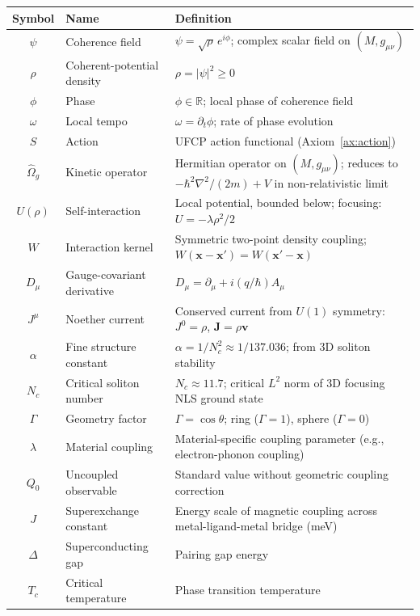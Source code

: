 \documentclass[11pt, a4paper]{article}
\begin{document}
\begin{center}
\begin{longtable}{@{}clp{7cm}@{}}
\toprule
\textbf{Symbol} & \textbf{Name} & \textbf{Definition} \\
\midrule
\endhead
$\psi$ & Coherence field & $\psi = \sqrt{\rho}\,e^{i\phi}$;
  complex scalar field on $(M, g_{\mu\nu})$ \\
$\rho$ & Coherent-potential density & $\rho = |\psi|^2 \geq 0$ \\
$\phi$ & Phase & $\phi \in \mathbb{R}$; local phase of
  coherence field \\
$\omega$ & Local tempo & $\omega = \partial_t\phi$; rate of
  phase evolution \\
$S$ & Action & UFCP action functional (Axiom~\ref{ax:action}) \\
$\hat{\Omega}_g$ & Kinetic operator & Hermitian operator on
  $(M, g_{\mu\nu})$; reduces to $-\hbar^2\nabla^2/(2m) + V$
  in non-relativistic limit \\
$U(\rho)$ & Self-interaction & Local potential, bounded below;
  focusing: $U = -\lambda\rho^2/2$ \\
$W$ & Interaction kernel & Symmetric two-point density coupling;
  $W(\mathbf{x}-\mathbf{x}') = W(\mathbf{x}'-\mathbf{x})$ \\
$D_\mu$ & Gauge-covariant derivative &
  $D_\mu = \partial_\mu + i(q/\hbar)A_\mu$ \\
$J^\mu$ & Noether current & Conserved current from $U(1)$
  symmetry: $J^0 = \rho$, $\mathbf{J} = \rho\mathbf{v}$ \\
$\alpha$ & Fine structure constant & $\alpha = 1/N_c^2 \approx
  1/137.036$; from 3D soliton stability \\
$N_c$ & Critical soliton number & $N_c \approx 11.7$; critical
  $L^2$ norm of 3D focusing NLS ground state \\
$\Gamma$ & Geometry factor & $\Gamma = \cos\theta$; ring
  ($\Gamma = 1$), sphere ($\Gamma = 0$) \\
$\lambda$ & Material coupling & Material-specific coupling
  parameter (e.g., electron-phonon coupling) \\
$Q_0$ & Uncoupled observable & Standard value without geometric
  coupling correction \\
$J$ & Superexchange constant & Energy scale of magnetic
  coupling across metal-ligand-metal bridge (meV) \\
$\Delta$ & Superconducting gap & Pairing gap energy \\
$T_c$ & Critical temperature & Phase transition temperature \\

\end{longtable}
\end{center}
\end{document}
